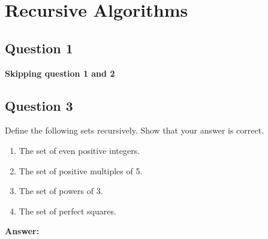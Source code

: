 \documentclass[openany]{report}
\begin{document}
\chapter{Recursive Algorithms}
\section{Question 1}
\begin{center}
    \textbf{Skipping question 1 and 2}
\end{center}
\setcounter{section}{2}
\section{Question 3}
Define the following sets recursively. Show that your answer is correct. 
\begin{enumerate}[label=(\alph*)]
    \item The set of even positive integers.
    \item The set of positive multiples of 5. 
    \item The set of powers of 3. 
    \item The set of perfect squares.
\end{enumerate}
\textbf{Answer:} 
\end{document}
